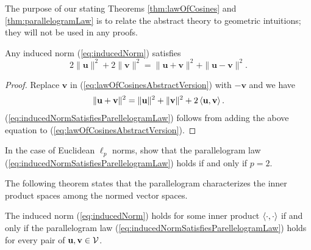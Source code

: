 \begin{rem}
  The purpose of our stating
  Theorems \ref{thm:lawOfCosines} and \ref{thm:parallelogramLaw}
  is to relate the abstract theory to geometric intuitions;
  they will not be used in any proofs.
\end{rem}

\begin{thm}
  \label{thm:inducedNormSatisfiesParellelogramLaw}
  Any induced norm (\ref{eq:inducedNorm}) satisfies
  \begin{equation}
    \label{eq:inducedNormSatisfiesParellelogramLaw}
    2\|\mathbf{u}\|^2 + 2\|\mathbf{v}\|^2
    = \|\mathbf{u}+\mathbf{v}\|^2 + \|\mathbf{u}-\mathbf{v}\|^2.
  \end{equation}
\end{thm}
\begin{proof}
  Replace $\mathbf{v}$ in (\ref{eq:lawOfCosinesAbstractVersion})
  with $-\mathbf{v}$ and we have
  \begin{align*}
    \|\mathbf{u} + \mathbf{v}\|^2
    = \|\mathbf{u}\|^2 + \|\mathbf{v}\|^2
    + 2\left\langle \mathbf{u}, \mathbf{v} \right\rangle.
  \end{align*}
  (\ref{eq:inducedNormSatisfiesParellelogramLaw})
  follows from adding the above equation
  to (\ref{eq:lawOfCosinesAbstractVersion}).
\end{proof}

\begin{exc}
  \label{exc:EuclideanPnormParallelogramLaw}
  In the case of Euclidean $\ell_p$ norms,
  show that the parallelogram law
  (\ref{eq:inducedNormSatisfiesParellelogramLaw})
  holds if and only if $p=2$.  
\end{exc}

\begin{rem}
  The following theorem states
  that the parallelogram characterizes the inner product spaces
  among the normed vector spaces.
\end{rem}

\begin{thm}
  \label{thm:parallelogramCharacterization}
  The induced norm (\ref{eq:inducedNorm}) holds
  for some inner product $\left\langle \cdot, \cdot \right\rangle$  
  if and only if the parallelogram law
  (\ref{eq:inducedNormSatisfiesParellelogramLaw})
  holds for every pair of $\mathbf{u}, \mathbf{v}\in {\cal V}$.
\end{thm}

